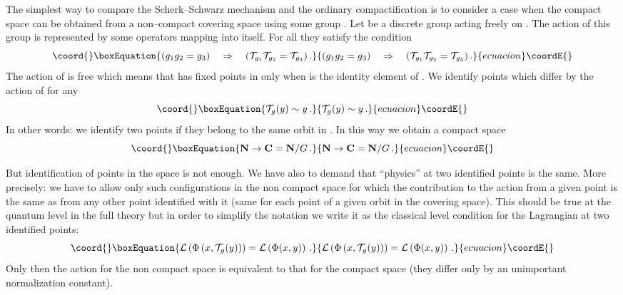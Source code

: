 \documentclass[a4paper,12pt]{article}
\def\cL{{\cal L}}
\def\cT{{\cal T}}
\def\bC{{\bf C}}
\def\bN{{\bf N}}
\begin{document}
The simplest way to compare the Scherk--Schwarz mechanism and the
ordinary compactification is to consider a case when the compact space
\myHighlight{$\bC$}\coordHE{} can be obtained from a non--compact covering space \myHighlight{$\bN$}\coordHE{} using
some group \coordHE{}. Let \coordHE{} be a discrete group acting freely on
\myHighlight{$\bN$}\coordHE{}. The action of this group is represented by some operators
\myHighlight{$\cT_g$}\coordHE{} mapping \myHighlight{$\bN$}\coordHE{} into itself. For all \coordHE{} they
satisfy the condition
\begin{equation}\coord{}\boxEquation{
(g_1g_2=g_3)
\quad\Rightarrow\quad
(\cT_{g_1}\cT_{g_2}=\cT_{g_3})
\,.
\label{cTgroup}
}{
(g_1g_2=g_3)
\quad\Rightarrow\quad
(\cT_{g_1}\cT_{g_2}=\cT_{g_3})
\,.
}{ecuacion}\coordE{}\end{equation}
The action of \coordHE{} is free which means that \myHighlight{$\cT_g$}\coordHE{} has fixed points in
\myHighlight{$\bN$}\coordHE{} only when \coordHE{} is the identity element of \coordHE{}.
We identify points which differ by the action of \myHighlight{$\cT_g$}\coordHE{} for any 
\coordHE{}
\begin{equation}\coord{}\boxEquation{
\cT_g(y) \sim y
\,.
}{
\cT_g(y) \sim y
\,.
}{ecuacion}\coordE{}\end{equation}
In other words: we identify two points if they belong to the same orbit
in \myHighlight{$\bN$}\coordHE{}. In this way we obtain a compact space
\begin{equation}\coord{}\boxEquation{
\bN\to\bC=\bN/G
\,.
}{
\bN\to\bC=\bN/G
\,.
}{ecuacion}\coordE{}\end{equation}


But identification of points in the space is not enough. We have also
to demand that ``physics'' at two identified points is the 
same. More precisely: we have to allow only such configurations in the
non compact space \myHighlight{$\bN$}\coordHE{} for which the contribution to the action from
a given point is the same as from any other point identified with it
(same for each point of a given orbit in the covering space).
This should be true at the quantum level in the full theory but in
order to simplify the notation we write it as the classical level
condition for the Lagrangian at two identified points:
\begin{equation}\coord{}\boxEquation{
\cL\left(\Phi\left(x,\cT_g(y)\right)\right)
=
\cL\left(\Phi(x,y)\right)
\,.
\label{Lperiod}
}{
\cL\left(\Phi\left(x,\cT_g(y)\right)\right)
=
\cL\left(\Phi(x,y)\right)
\,.
}{ecuacion}\coordE{}\end{equation}
Only then the action for the non compact space \myHighlight{$\bN$}\coordHE{} is equivalent 
to that for the compact space \myHighlight{$\bC$}\coordHE{} (they differ only by an
unimportant normalization constant).  
\end{document}
